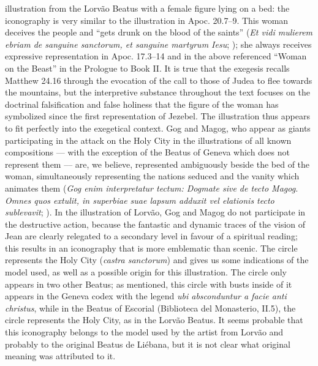 \begin{paper}
illustration from the Lorvão Beatus with a female figure lying on a bed:
the iconography is very similar to the illustration in Apoc. 20.7--9.
This woman deceives the people and ``gets drunk on the blood of the
saints'' (\emph{Et vidi mulierem ebriam de sanguine sanctorum, et
sanguine martyrum Iesu}; \citealt[568]{gonzalez_echegaray_obras_1995}); she
always receives expressive representation in Apoc. 17.3--14 and in the
above referenced ``Woman on the Beast'' in the Prologue to Book II. It
is true that the exegesis recalls Matthew 24.16 through the evocation of
the call to those of Judea to flee towards the mountains, but the interpretive substance
throughout the text focuses on the doctrinal falsification and false
holiness that the figure of the woman has symbolized since the first
representation of Jezebel. The illustration thus appears to fit
perfectly into the exegetical context. Gog and Magog, who appear as
giants participating in the attack on the Holy City in the illustrations
of all known compositions –– with the exception of the Beatus of Geneva
which does not represent them –– are, we believe, represented
ambiguously beside the bed of the woman, simultaneously representing the
nations seduced and the vanity which animates them (\emph{Gog enim
interpretatur tectum: Dogmate sive de tecto Magog. Omnes quos extulit,
in superbiae suae lapsum adduxit vel elationis tecto sublevavit}; \citealt[620]{gonzalez_echegaray_obras_1995}). In the illustration of Lorvão, Gog
and Magog do not participate in the destructive action, because the
fantastic and dynamic traces of the vision of Jean are clearly relegated
to a secondary level in favour of a spiritual reading; this results in
an iconography that is more emblematic than scenic. The circle
represents the Holy City (\emph{castra sanctorum}) and gives us some
indications of the model used, as well as a possible origin for this
illustration. The circle only appears in two other Beatus; as mentioned,
this circle with busts inside of it appears in the Geneva codex with the
legend \emph{ubi absconduntur a facie anti christus}, while in the
Beatus of Escorial (Biblioteca del Monasterio, II.5), the circle
represents the Holy City, as in the Lorvão Beatus. It seems probable that
this iconography belongs to the model used by the artist from Lorvão and
probably to the original Beatus de Liébana, but it is not clear what
original meaning was attributed to it.


\end{paper}
